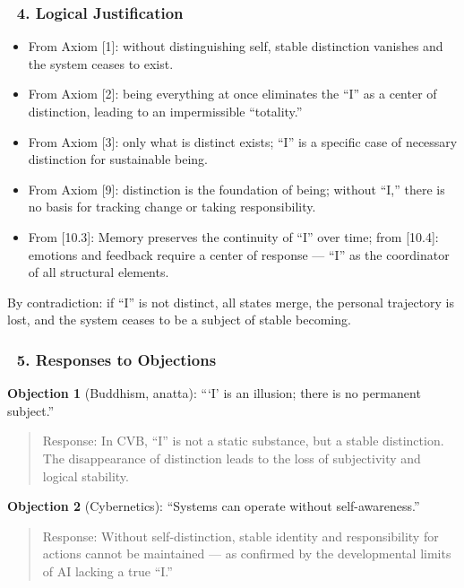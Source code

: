 \documentclass[12pt]{article}
\begin{document}
\subsubsection*{🔹 4. Logical Justification}

\begin{itemize}
\item From Axiom [1]: without distinguishing self, stable distinction vanishes and the system ceases to exist.
\item From Axiom [2]: being everything at once eliminates the ``I'' as a center of distinction, leading to an impermissible ``totality.''
\item From Axiom [3]: only what is distinct exists; ``I'' is a specific case of necessary distinction for sustainable being.
\item From Axiom [9]: distinction is the foundation of being; without ``I,'' there is no basis for tracking change or taking responsibility.
\item From [10.3]: Memory preserves the continuity of ``I'' over time; from [10.4]: emotions and feedback require a center of response — ``I'' as the coordinator of all structural elements.
\end{itemize}

By contradiction: if ``I'' is not distinct, all states merge, the personal trajectory is lost, and the system ceases to be a subject of stable becoming.

\subsubsection*{🔹 5. Responses to Objections}

\textbf{Objection 1} (Buddhism, anatta): ```I' is an illusion; there is no permanent subject.''

\begin{quote}
Response: In CVB, ``I'' is not a static substance, but a stable distinction. The disappearance of distinction leads to the loss of subjectivity and logical stability.
\end{quote}

\textbf{Objection 2} (Cybernetics): ``Systems can operate without self-awareness.''

\begin{quote}
Response: Without self-distinction, stable identity and responsibility for actions cannot be maintained — as confirmed by the developmental limits of AI lacking a true ``I.''
\end{quote}
\end{document}
